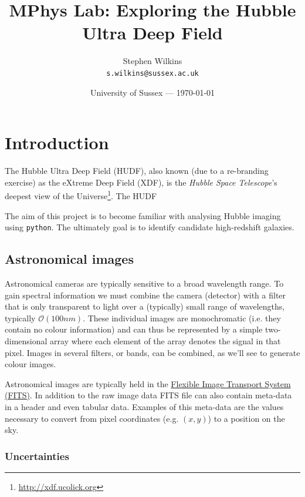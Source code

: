 \documentclass{article}
\title{MPhys Lab: Exploring the Hubble Ultra Deep Field} %
\author{Stephen Wilkins\\ \texttt{s.wilkins@sussex.ac.uk}} %
\date{University of Sussex --- \today} %
\begin{document}
\maketitle %


\section*{Introduction} %

The Hubble Ultra Deep Field (HUDF), also known (due to a re-branding exercise) as the eXtreme Deep Field (XDF), is the {\em Hubble Space Telescope}'s deepest view of the Universe\footnote{\url{http://xdf.ucolick.org}}. The HUDF

The aim of this project is to become familiar with analysing Hubble imaging using \texttt{python}. The ultimately goal is to identify candidate high-redshift galaxies.


\subsection*{Astronomical images}

Astronomical cameras are typically sensitive to a broad wavelength range. To gain spectral information we must combine the camera (detector) with a filter that is only transparent to light over a (typically) small range of wavelengths, typically $\mathcal{O}(100nm)$. These individual images are monochromatic (i.e. they contain no colour information) and can thus be represented by a simple two-dimensional array where each element of the array denotes the signal in that pixel. Images in several filters, or bands, can be combined, as we'll see to generate colour images.

Astronomical images are typically held in the \href{https://en.wikipedia.org/wiki/FITS}{Flexible Image Transport System (FITS)}. In addition to the raw image data FITS file can also contain meta-data in a header and even tabular data. Examples of this meta-data are the values necessary to convert from pixel coordinates (e.g. $(x,y)$) to a position on the sky.

\subsubsection*{Uncertainties}
\end{document}
